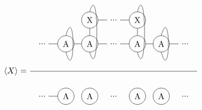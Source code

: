 \begin{equation}
    \Braket{X} = \frac{
        \begin{tikzpicture} [   ]
        	\clip (-1.5,-1) rectangle (5.5,2);
        
        	\node[] (N0) at (-1,0) {...};
        	\node[circle, draw] (N1) at (0,0) {A};
        	\node[circle, draw] (N2) at (1,0) {A};
        	\node[circle, draw] (X2) at (1,1) {X};
        
        	\node[] (N3) at (2 ,0) {...};
        	\node[] (X3) at (2,1) {...};
        
        	\node[circle, draw] (N4) at (3 ,0) {A};
        	\node[circle, draw] (X4) at (3,1) {X};
        
        	\node[circle, draw] (N5) at (4 ,0) {A};
        	\node[] (N6) at (5 ,0) {...};
        
        	\draw  (N0) -- (N1) ;
        
        	\draw  (N1) -- (N2) ;
        	\draw  (N2) -- (N3) ;
        	\draw  (N3) -- (N4) ;
        	\draw  (N4) -- (N5) ;
        	\draw  (N5) -- (N6) ;
        
        
        	\draw  (X2) -- (X3) ;
        	\draw  (X3) -- (X4) ;
        
        	\draw  (N2) -- (X2) ;
        	\draw  (N4) -- (X4) ;
        
        	\draw (X2.north)   .. controls +(0.4,1.4) and +(0.4,-1.4) .. (N2.south);
        	\draw (X4.north)   .. controls +(0.4,1.4) and +(0.4,-1.4) .. (N4.south);
        
        
        	\draw (N1.north)   .. controls +(0.4,1.4) and +(0.4,-1.4) .. (N1.south);
        	\draw (N5.north)   ..  controls +(0.4,1.4) and +(0.4,-1.4)  .. (N5.south);
        \end{tikzpicture}
    }{
        \begin{tikzpicture} [   ]

        	\clip  (-1.5,-3) rectangle (5.5,-1);
        
        
        	\node[] (O0) at (-1,-2) {...};
        	\node[circle, draw] (O1) at (0,-2) {A};
        	\node[circle, draw] (O2) at (1,-2) {A};
        
        
        	\node[] (O3) at (2 ,-2) {...};
        	\node[circle, draw] (O4) at (3 ,-2) {A};
        
        	\node[circle, draw] (O5) at (4 ,-2) {A};
        	\node[] (O6) at (5 ,-2) {...};
        
        	\draw  (O0) -- (O1) ;
        

\end{tikzpicture}}
\end{equation}
